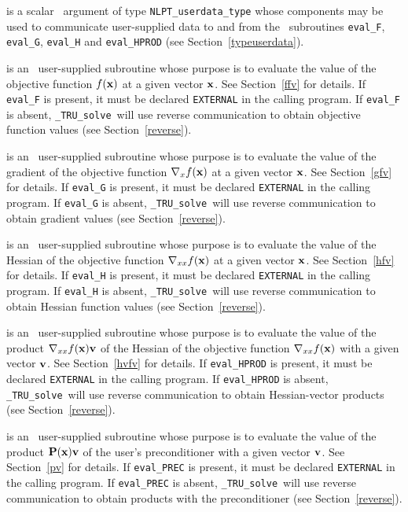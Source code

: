 \documentclass{galahad}
\newcommand{\packagename}{TRU}
\newcommand{\fullpackagename}{\libraryname\_\packagename}
\newcommand{\solver}{{\tt \fullpackagename\_solve}}
\begin{document}
\begin{description}
 is a scalar \intentinout\ argument of type
{\tt NLPT\_userdata\_type} whose components may be used
to communicate user-supplied data to and from the
\optional\ subroutines
{\tt eval\_F}, {\tt eval\_G},
{\tt eval\_H} and {\tt eval\_HPROD}
(see Section~\ref{typeuserdata}).

 is an \optional\
user-supplied subroutine whose purpose is to evaluate the value of the
objective function $f({\mathbf{x}})$ at a given vector ${\mathbf{x}}$.
See Section~\ref{ffv} for details.
If {\tt eval\_F} is present,
it must be declared {\tt EXTERNAL} in the calling program.
If {\tt eval\_F} is absent, \solver\ will use reverse communication to
obtain objective function values (see Section~\ref{reverse}).

 is an \optional\
user-supplied subroutine whose purpose is to evaluate the value of the
gradient of the objective function $\nabla_x f({\mathbf{x}})$ at a given vector ${\mathbf{x}}$.
See Section~\ref{gfv} for details.
If {\tt eval\_G} is present,
it must be declared {\tt EXTERNAL} in the calling program.
If {\tt eval\_G} is absent, \solver\ will use reverse communication to
obtain gradient values (see Section~\ref{reverse}).

 is an \optional\
user-supplied subroutine whose purpose is to evaluate the value of the
Hessian of the objective function $\nabla_{xx} f({\mathbf{x}})$ at a given vector ${\mathbf{x}}$.
See Section~\ref{hfv} for details.
If {\tt eval\_H} is present,
it must be declared {\tt EXTERNAL} in the calling program.
If {\tt eval\_H} is absent, \solver\ will use reverse communication to
obtain Hessian function values (see Section~\ref{reverse}).

\itt{eval\_HPROD} is an \optional\
user-supplied subroutine whose purpose is to evaluate the value of the
product $\nabla_{xx} f({\mathbf{x}}){\mathbf{v}}$ of the Hessian of the objective function
$\nabla_{xx} f({\mathbf{x}})$  with a given vector ${\mathbf{v}}$.
See Section~\ref{hvfv} for details.
If {\tt eval\_HPROD} is present,
it must be declared {\tt EXTERNAL} in the calling program.
If {\tt eval\_HPROD} is absent, \solver\ will use reverse communication to
obtain Hessian-vector products (see Section~\ref{reverse}).

\itt{eval\_PREC} is an \optional\
user-supplied subroutine whose purpose is to evaluate the value of the
product ${\mathbf{P}}({\mathbf{x}}){\mathbf{v}}$ of the user's preconditioner with a given vector
${\mathbf{v}}$. See Section~\ref{pv} for details.
If {\tt eval\_PREC} is present,
it must be declared {\tt EXTERNAL} in the calling program.
If {\tt eval\_PREC} is absent, \solver\ will use reverse communication to
obtain products with the preconditioner (see Section~\ref{reverse}).

\end{description}
\end{document}
